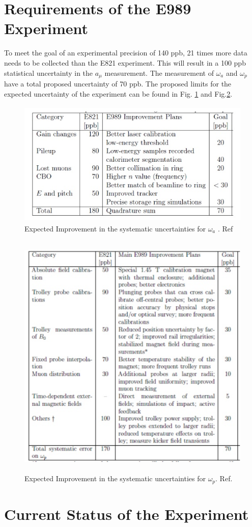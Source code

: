 \documentclass[./Thesis]{subfiles}
\begin{document}
\section{Requirements of the E989 Experiment}
	To meet the goal of an experimental precision of 140 ppb, 21 times more data needs to be collected than the E821 experiment. This will result in a 100 ppb statistical uncertainty in the $a_\mu$ measurement. The measurement of $\omega_a$ and $\omega_p$ have a total proposed uncertainty of 70 ppb. The proposed limits for the expected uncertainty of the experiment can be found in Fig. \ref{fig:wauncertainty} and Fig.\ref{fig:wpuncertainty}.

\begin{figure}
\centerline{\includegraphics[height=60mm]{wauncertainty.jpeg}}
\caption[Expected improvement of $\omega_a$ measurement in E989]{ Expected Improvement in the systematic uncertainties for $\omega_a$ . Ref \cite{TDR}
	}
\label{fig:wauncertainty}
\end{figure}

\begin{figure}
\centerline{\includegraphics[height=120mm]{wpuncertainty.jpeg}}
\caption[Expected improvement of $\omega_p$ measurement in E989]{ Expected Improvement in the systematic uncertainties for $\omega_p$. Ref. \cite{TDR}
	}
\label{fig:wpuncertainty}
\end{figure}

\section{Current  Status of the Experiment}
\end{document}
